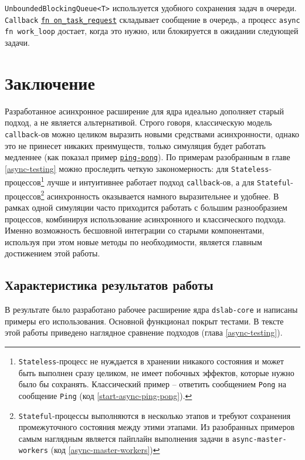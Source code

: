 \texttt{UnboundedBlockingQueue<T>} используется удобного сохранения задач в очереди. \texttt{Сallback} \texttt{\underline{fn on\_task\_request}} складывает сообщение в очередь, а процесс \texttt{async fn work\_loop} достает, когда это нужно, или блокируется в ожидании следующей задачи.

\section{Заключение}

Разработанное асинхронное расширение для ядра идеально дополняет старый подход, а не является альтернативой. Строго говоря, классическую модель \texttt{callback}-ов можно целиком выразить новыми средствами асинхронности, однако это не принесет никаких преимуществ, только симуляция будет работать медленнее (как показал пример \hyperref[cmp:ping-pong]{\texttt{ping-pong}}). По примерам разобранным в главе \ref{async-testing} можно проследить четкую закономерность: для \texttt{Stateless}-процессов\footnote{
    \texttt{Stateless}-процесс не нуждается в хранении никакого состояния и может быть выполнен сразу целиком, не имеет побочных эффектов, которые нужно было бы сохранять. Классический пример -- ответить сообщением \texttt{Pong} на сообщение \texttt{Ping} (код \ref{start-async-ping-pong}). }
лучше и интуитивнее работает подход \texttt{callback}-ов, а для \texttt{Stateful}-процессов\footnote{
    \texttt{Stateful}-процессы выполняются в несколько этапов и требуют сохранения промежуточного состояния между этими этапами. Из разобранных примеров самым наглядным является пайплайн выполнения задачи в \texttt{async-master-workers} (код \ref{async-master-workers})} 
асинхронность оказывается намного выразительнее и удобнее. В рамках одной симуляции часто приходится работать с большим разнообразием процессов, комбинируя использование асинхронного и классического подхода. Именно возможность бесшовной интеграции со старыми компонентами, используя при этом новые методы по необходимости, является главным достижением этой работы.



\subsection{Характеристика результатов работы}

В результате было разработано рабочее расширение ядра \texttt{dslab-core}\cite{async-dslab-core} и написаны примеры его использования\cite{async-ping-pong-example}\cite{async-event-details-example}\cite{async-master-workers-example}. Основной функционал покрыт тестами. В тексте этой работы приведено наглядное сравнение подходов (глава \ref{async-testing}).

